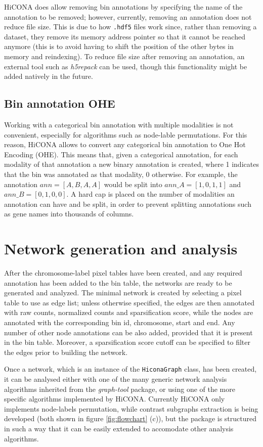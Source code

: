 HiCONA does allow removing bin annotations by specifying the name of the annotation to be removed; however, currently, removing an annotation does not reduce file size. This is due to how \texttt{.hdf5} files work since, rather than removing a dataset, they remove its memory address pointer so that it cannot be reached anymore (this is to avoid having to shift the position of the other bytes in memory and reindexing). To reduce file size after removing an annotation, an external tool such as \emph{h5repack} can be used, though this functionality might be added natively in the future.

\subsection{Bin annotation OHE}

Working with a categorical bin annotation with multiple modalities is not convenient, especially for algorithms such as node-lable permutations. For this reason, HiCONA allows to convert any categorical bin annotation to One Hot Encoding (OHE). This means that, given a categorical annotation, for each modality of that annotation a new binary annotation is created, where 1 indicates that the bin was annotated as that modality, 0 otherwise. For example, the annotation $ann=[A,B,A,A]$ would be split into $ann\_A=[1,0,1,1]$ and $ann\_B=[0,1,0,0]$. A hard cap is placed on the number of modalities an annotation can have and be split, in order to prevent splitting annotations such as gene names into thousands of columns.

\section{Network generation and analysis}

After the chromosome-label pixel tables have been created, and any required annotation has been added to the bin table, the networks are ready to be generated and analyzed. The minimal network is created by selecting a pixel table to use as edge list; unless otherwise specified, the edges are then annotated with raw counts, normalized counts and sparsification score, while the nodes are annotated with the corresponding bin id, chromosome, start and end. Any number of other node annotations can be also added, provided that it is present in the bin table. Moreover, a sparsification score cutoff can be specified to filter the edges prior to building the network.

Once a network, which is an instance of the \texttt{HiconaGraph} class, has been created, it can be analysed either with one of the many generic network analysis algorithms inherited from the \emph{graph-tool} package, or using one of the more specific algorithms implemented by HiCONA. Currently HiCONA only implements node-labels permutation, while contrast subgraphs extraction is being developed (both shown in figure \ref{fig:flowchart} (c)), but the package is structured in such a way that it can be easily extended to accomodate other analysis algorithms.

